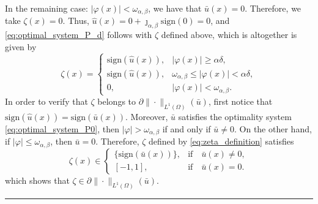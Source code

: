 \documentclass[11pt,a4paper]{amsart}
\newcommand{\kw}{\rule{2mm}{2mm}}
\newcommand{\om}{\Omega}
\newcommand{\sign}{\mathrm{sign}}
\renewenvironment{proof}{{Proof.}}{\hfill\kw}
\begin{document}
\begin{proof}


In the remaining case: $|\varphi(x)|<\omega_{\alpha,\beta}$, we have that $\bar u(x)=0$. Therefore, we take $\zeta(x)=0$.  Thus, $\hat u(x)=0+\jmath_{\alpha, \beta}\sign(0)=0$, and  \eqref{eq:optimal_system_P_d} follows with $\zeta$ defined above, which is altogether is given by 
\begin{equation}\label{eq:zeta_definition}
\zeta(x)=
\begin{cases} 
\sign(\hat u(x)), &|\varphi(x)|\ge \alpha \delta,\\
\sign(\hat u(x)),&\omega_{\alpha,\beta}\le |\varphi(x)|<\alpha\delta,\\
0, &|\varphi(x)|<\omega_{\alpha,\beta}.
\end{cases}
\end{equation}
In order to verify that $\zeta$ belongs to $\partial\|\cdot\|_{L^1(\om)}(\bar u)$, first notice that $\sign(\hat u(x))=\sign(\bar u(x))$. Moreover, $\bar u$ satisfies the optimality system \eqref{eq:optimal_system_P0}, then $|\varphi|> \omega_{\alpha,\beta} $ if and only if $\bar u \not =0$. On the other hand, if  $|\varphi| \leq \omega_{\alpha,\beta} $, then $\bar u = 0$. Therefore, $\zeta$ defined by \eqref{eq:zeta_definition} satisfies
$$
\zeta(x) \in
\begin{cases} 
\{\sign(\bar u(x))\}, & \text{if}\quad \bar u(x) \neq 0,\\
[-1,1], & \text{if}\quad\bar u(x) = 0.
\end{cases}
$$
which shows that $\zeta \in \partial\|\cdot\|_{L^1(\om)}(\bar u)$.
\end{proof}
\end{document}

